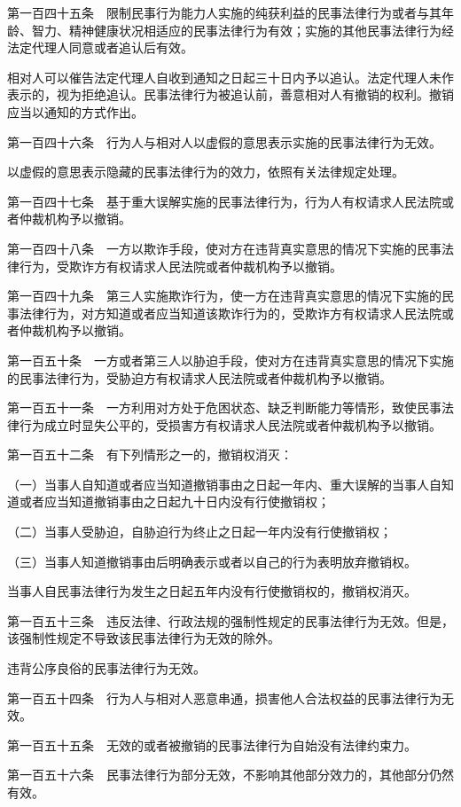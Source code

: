 \documentclass[UTF8,12pt,a4paper]{ctexbook}
\begin{document}
第一百四十五条　限制民事行为能力人实施的纯获利益的民事法律行为或者与其年龄、智力、精神健康状况相适应的民事法律行为有效；实施的其他民事法律行为经法定代理人同意或者追认后有效。

相对人可以催告法定代理人自收到通知之日起三十日内予以追认。法定代理人未作表示的，视为拒绝追认。民事法律行为被追认前，善意相对人有撤销的权利。撤销应当以通知的方式作出。

第一百四十六条　行为人与相对人以虚假的意思表示实施的民事法律行为无效。

以虚假的意思表示隐藏的民事法律行为的效力，依照有关法律规定处理。

第一百四十七条　基于重大误解实施的民事法律行为，行为人有权请求人民法院或者仲裁机构予以撤销。

第一百四十八条　一方以欺诈手段，使对方在违背真实意思的情况下实施的民事法律行为，受欺诈方有权请求人民法院或者仲裁机构予以撤销。

第一百四十九条　第三人实施欺诈行为，使一方在违背真实意思的情况下实施的民事法律行为，对方知道或者应当知道该欺诈行为的，受欺诈方有权请求人民法院或者仲裁机构予以撤销。

第一百五十条　一方或者第三人以胁迫手段，使对方在违背真实意思的情况下实施的民事法律行为，受胁迫方有权请求人民法院或者仲裁机构予以撤销。

第一百五十一条　一方利用对方处于危困状态、缺乏判断能力等情形，致使民事法律行为成立时显失公平的，受损害方有权请求人民法院或者仲裁机构予以撤销。

第一百五十二条　有下列情形之一的，撤销权消灭：

（一）当事人自知道或者应当知道撤销事由之日起一年内、重大误解的当事人自知道或者应当知道撤销事由之日起九十日内没有行使撤销权；

（二）当事人受胁迫，自胁迫行为终止之日起一年内没有行使撤销权；

（三）当事人知道撤销事由后明确表示或者以自己的行为表明放弃撤销权。

当事人自民事法律行为发生之日起五年内没有行使撤销权的，撤销权消灭。

第一百五十三条　违反法律、行政法规的强制性规定的民事法律行为无效。但是，该强制性规定不导致该民事法律行为无效的除外。

违背公序良俗的民事法律行为无效。

第一百五十四条　行为人与相对人恶意串通，损害他人合法权益的民事法律行为无效。

第一百五十五条　无效的或者被撤销的民事法律行为自始没有法律约束力。

第一百五十六条　民事法律行为部分无效，不影响其他部分效力的，其他部分仍然有效。
\end{document}
